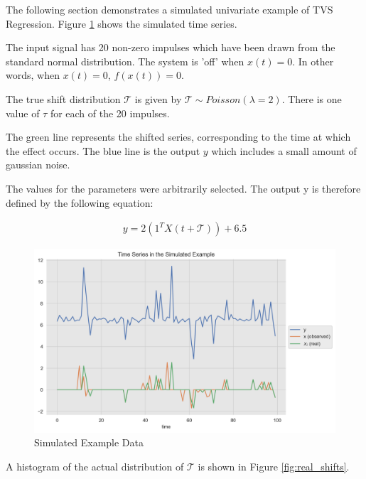 \documentclass[11pt]{amsart}
\theoremstyle{definition}
\begin{document}
The following section demonstrates a simulated univariate example of TVS Regression. Figure \ref{fig:simulated_example} shows the simulated time series.

The input signal has 20 non-zero impulses which have been drawn from the standard normal distribution. The system is 'off' when $x(t) =0$. In other words, when $x(t) = 0$, $f(x(t)) = 0$. 

The true shift distribution $\mathcal{T}$ is given by $\mathcal{T} \sim Poisson(\lambda = 2)$. There is one value of $\tau$ for each of the 20 impulses.

The green line represents the shifted series, corresponding to the time at which the effect occurs. The blue line is the output $y$ which includes a small amount of gaussian noise.

The values for the parameters were arbitrarily selected. The output y is therefore defined by the following equation:


\begin{align}
    y = 2(1^TX(t + \mathcal{T})) + 6.5
\end{align}


\begin{center}
\begin{figure}
\includegraphics[scale=0.5]{images/simulated_example.png}
\caption{Simulated Example Data}
\label{fig:simulated_example}
\end{figure}
\end{center}

A histogram of the actual distribution of $\mathcal{T}$ is shown in Figure \ref{fig:real_shifts}.
\end{document}
